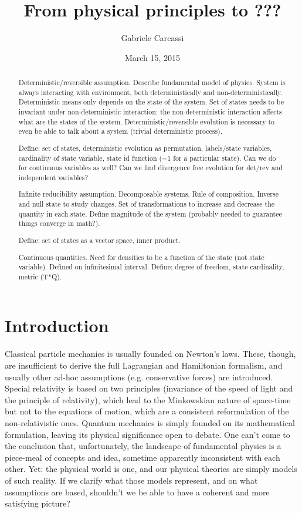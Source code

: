 \documentclass[aps,pra,10pt,twocolumn,floatfix,nofootinbib]{revtex4-1}
\theoremstyle{definition}
\begin{document}
\title{From physical principles to ???}
\author{Gabriele Carcassi}
\date{March 15, 2015}

\begin{abstract}
Deterministic/reversible assumption. Describe fundamental model of physics. System is always interacting with environment, both deterministically and non-deterministically. Deterministic means only depends on the state of the system. Set of states needs to be invariant under non-deterministic interaction: the non-deterministic interaction affects what are the states of the system. Deterministic/reversible evolution is necessary to even be able to talk about a system (trivial deterministic process).

Define: set of states, deterministic evolution as permutation, labels/state variables, cardinality of state variable, state id function (=1 for a particular state). Can we do for continuous variables as well? Can we find divergence free evolution for det/rev and independent variables?

Infinite reducibility assumption. Decomposable systems. Rule of composition. Inverse and null state to study changes. Set of transformations to increase and decrease the quantity in each state. Define magnitude of the system (probably needed to guarantee things converge in math?).

Define: set of states as a vector space, inner product.

Continuous quantities. Need for densities to be a function of the state (not state variable). Defined on infinitesimal interval. Define: degree of freedom, state cardinality, metric (T*Q).
\end{abstract}
\maketitle

\section{Introduction}

Classical particle mechanics is usually founded on Newton's laws. These, though, are insufficient to derive the full Lagrangian and Hamiltonian formalism, and usually other ad-hoc assumptions (e.g. conservative forces) are introduced. Special relativity is based on two principles (invariance of the speed of light and the principle of relativity), which lead to the Minkowskian nature of space-time but not to the equations of motion, which are a consistent reformulation of the non-relativistic ones. Quantum mechanics is simply founded on its mathematical formulation, leaving its physical significance open to debate. One can't come to the conclusion that, unfortunately, the landscape of fundamental physics is a piece-meal of concepts and idea, sometime apparently inconsistent with each other. Yet: the physical world is one, and our physical theories are simply models of such reality. If we clarify what those models represent, and on what assumptions are based, shouldn't we be able to have a coherent and more satisfying picture?
\end{document}
